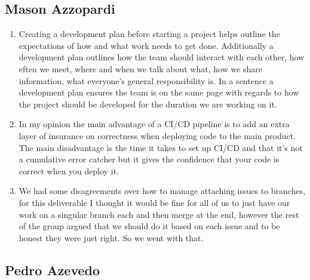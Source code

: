 \documentclass{article}
\begin{document}
\subsection*{Mason Azzopardi}
\begin{enumerate}
  \item Creating a development plan before starting a project helps outline the expectations of how and what work needs to get done. Additionally a development plan outlines how the team should interact with each other, how eften we meet, where and when we talk about what, how we share information, what everyone's general responsibility is. In a sentence a development plan ensures the team is on the same page with regards to how the project should be developed for the duration we are working on it.
  \item In my opinion the main advantage of a CI/CD pipeline is to add an extra layer of insurance on correctness when deploying code to the main product. The main disadvantage is the time it takes to set up CI/CD and that it's not a cumulative error catcher but it gives the confidence that your code is correct when you deploy it.
  \item We had some disagreements over how to manage attaching issues to branches, for this deliverable I thought it would be fine for all of us to just have our work on a singular branch each and then merge at the end, however the rest of the group argued that we should do it based on each issue and to be honest they were just right. So we went with that.
  \end{enumerate}

\subsection*{Pedro Azevedo}
\end{document}
